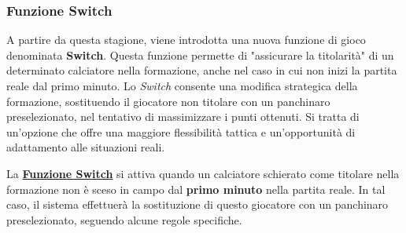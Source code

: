 \documentclass[12pt]{article}
\begin{document}
\subsubsection{Funzione Switch}
A partire da questa stagione, viene introdotta una nuova funzione di gioco denominata \textbf{Switch}. Questa funzione permette di "assicurare la titolarità" di un determinato calciatore nella formazione, anche nel caso in cui non inizi la partita reale dal primo minuto. Lo \textit{Switch} consente una modifica strategica della formazione, sostituendo il giocatore non titolare con un panchinaro preselezionato, nel tentativo di massimizzare i punti ottenuti. Si tratta di un'opzione che offre una maggiore flessibilità tattica e un'opportunità di adattamento alle situazioni reali.

La \textbf{\hyperref[funzione-switch]{Funzione Switch}} si attiva quando un calciatore schierato come titolare nella formazione non è sceso in campo dal \textbf{primo minuto} nella partita reale. In tal caso, il sistema effettuerà la sostituzione di questo giocatore con un panchinaro preselezionato, seguendo alcune regole specifiche.
\end{document}
